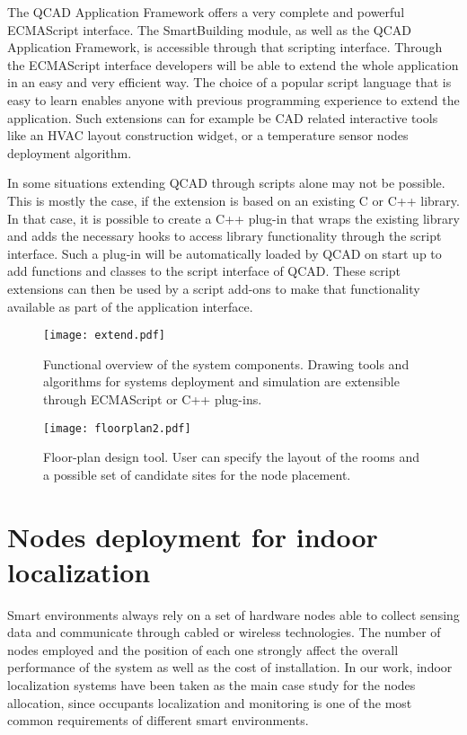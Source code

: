 The QCAD Application Framework offers a very complete and powerful ECMAScript interface. The SmartBuilding module, as well as the QCAD Application Framework, is accessible through that scripting interface. Through the ECMAScript interface developers will be able to extend the whole application in an easy and very efficient way. The choice of a popular script language that is easy to learn enables anyone with previous programming experience to extend the application. Such extensions can for example be CAD related interactive tools like an HVAC layout construction widget, or a temperature sensor nodes deployment algorithm.

In some situations extending QCAD through scripts alone may not be possible. This is mostly the case, if the extension is based on an existing C or C++ library. In that case, it is possible to create a C++ plug-in that wraps the existing library and adds the necessary hooks to access library functionality through the script interface. Such a plug-in will be automatically loaded by QCAD on start up to add functions and classes to the script interface of QCAD. These script extensions can then be used by a script add-ons to make that functionality available as part of the application interface.


\begin{figure}[h!tb]
\centering\texttt{[image: extend.pdf]}
\caption[Functional overview of the system components of the CAD application.]{Functional overview of the system components. Drawing tools and algorithms for systems deployment and simulation are extensible through ECMAScript or C++ plug-ins.}
\end{figure}

\begin{figure}
\centering\texttt{[image: floorplan2.pdf]}
\caption[Graphical interface of the floor-plan design of the CAD tool.]{Floor-plan design tool. User can specify the layout of the rooms and a possible set of candidate sites for the node placement.}
\label{fig:floor}
\end{figure}

\section{Nodes deployment for indoor localization}\label{sec:problem}
Smart environments always rely on a set of hardware nodes able to collect sensing data and communicate through cabled or wireless technologies. The number of nodes employed and the position of each one strongly affect the overall performance of the system as well as the cost of installation.
In our work, indoor localization systems have been taken as the main case study for the nodes allocation, since occupants localization and monitoring is one of the most common requirements of different smart environments.

